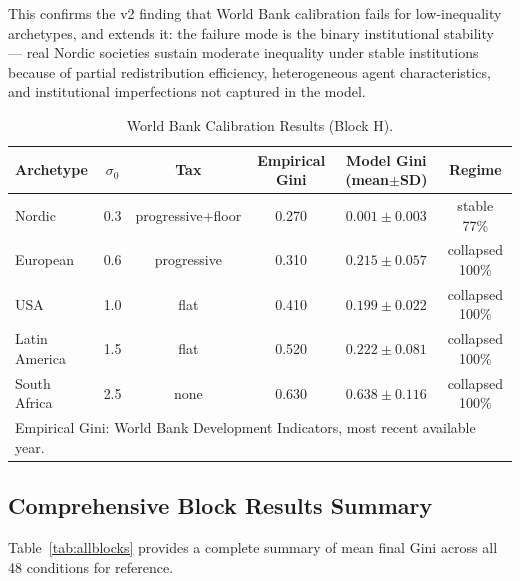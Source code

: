 \documentclass[12pt, letterpaper]{article}
\begin{document}
This confirms the v2 finding that World Bank calibration fails
for low-inequality archetypes, and extends it: the failure mode is
the binary institutional stability --- real Nordic societies
sustain moderate inequality under stable institutions because of
partial redistribution efficiency, heterogeneous agent characteristics,
and institutional imperfections not captured in the model.

\begin{table}[h]
\centering
\caption{World Bank Calibration Results (Block H).}
\label{tab:wb}
\small
\begin{tabular}{lccccc}
\toprule
Archetype & $\sigma_0$ & Tax & Empirical Gini & Model Gini (mean$\pm$SD) & Regime \\
\midrule
Nordic       & 0.3 & progressive+floor & 0.270 & $0.001 \pm 0.003$ & stable 77\% \\
European     & 0.6 & progressive        & 0.310 & $0.215 \pm 0.057$ & collapsed 100\% \\
USA          & 1.0 & flat               & 0.410 & $0.199 \pm 0.022$ & collapsed 100\% \\
Latin America& 1.5 & flat               & 0.520 & $0.222 \pm 0.081$ & collapsed 100\% \\
South Africa & 2.5 & none               & 0.630 & $0.638 \pm 0.116$ & collapsed 100\% \\
\bottomrule
\multicolumn{6}{l}{\small Empirical Gini: World Bank Development Indicators, most recent available year.}
\end{tabular}
\end{table}

\subsection{Comprehensive Block Results Summary}

Table~\ref{tab:allblocks} provides a complete summary of mean final
Gini across all 48 conditions for reference.
\end{document}
